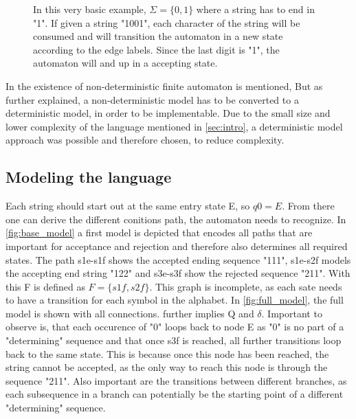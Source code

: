 \documentclass{article}
\begin{document}
\begin{figure}
\centering
{}
\caption{In this very basic example, $\Sigma = \{0, 1\}$ where a string has to end in "1". 
If given a string "1001", each character of the string will be consumed and will transition the automaton
in a new state according to the edge labels. Since the last digit is "1", the automaton will and up in a 
accepting state.}
\label{fig:example_automaton}
\end{figure}

In \cite{hopcroft2001introduction} the existence of non-deterministic finite automaton is mentioned, But as further explained, a non-deterministic model has to be converted to a deterministic model,
in order to be implementable.
Due to the small size and lower complexity of the language mentioned in \cref{sec:intro}, a deterministic model approach was possible and therefore chosen,
to reduce complexity.

\subsection{Modeling the language}
Each string should start out at the same entry state E, so $q0=E$. From there one can derive the different conitions path, the automaton needs to recognize.
In \cref{fig:base_model} a first model is depicted that encodes all paths that are important for acceptance and rejection and therefore also determines all required states. The path s1e-s1f shows the accepted ending sequence "111", 
s1e-s2f models the accepting end string "122" and s3e-s3f show the rejected sequence "211". With this F is defined as $F=\{s1f, s2f\}$. This graph is incomplete, as each sate needs to have a transition for each symbol in the alphabet. 
In \cref{fig:full_model}, the full model is shown with all connections.  further implies Q and $\delta$. Important to observe is, that each occurence of "0"
loops back to node E as "0" is no part of a "determining" sequence and that once s3f is reached, all further transitions loop back to the same state. 
This is because once this node has been reached, the string cannot be accepted, as the only way to reach this node is through the sequence "211". Also important are the
transitions between different branches, as each subsequence in a branch can potentially be the starting point of a different "determining" sequence.
\end{document}
